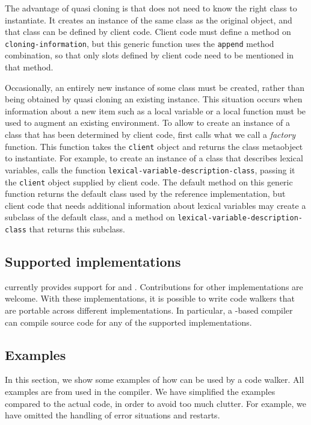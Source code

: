 The advantage of quasi cloning is that \trucler{} does not need to know
the right class to instantiate.  It creates an instance of the same
class as the original object, and that class can be defined by client
code.  Client code must define a method on
\texttt{cloning-information}, but this generic function uses the
\texttt{append} method combination, so that only slots defined by
client code need to be mentioned in that method.

Occasionally, an entirely new instance of some class must be created,
rather than being obtained by quasi cloning an existing instance.
This situation occurs when information about a new item such as a
local variable or a local function must be used to augment an existing
environment.  To allow \trucler{} to create an instance of a class
that has been determined by client code, \trucler{} first calls what
we call a \emph{factory} function.  This function takes the
\texttt{client} object and returns the class metaobject to
instantiate.  For example, to create an instance of a class that
describes lexical variables, \trucler{} calls the function
\texttt{lexical-variable-description-class}, passing it the
\texttt{client} object supplied by client code.  The default method on
this generic function returns the default class used by the reference
implementation, but client code that needs additional information
about lexical variables may create a subclass of the default class,
and a method on \texttt{lexical-variable-description-class} that
returns this subclass.

\subsection{Supported \commonlisp{} implementations}
\label{trucler-supported-implementations}

\trucler{} currently provides support for \sbcl{} and \ccl{}.
Contributions for other \commonlisp{} implementations are welcome.
With these implementations, it is possible to write code walkers that
are portable across different \commonlisp{} implementations.  In
particular, a \cleavir{}-based compiler can compile source code for
any of the supported implementations.

\subsection{Examples}

In this section, we show some examples of how \trucler{} can be used
by a code walker.  All examples are from \cleavir{} used in the
\sicl{} compiler.  We have simplified the examples compared to the
actual code, in order to avoid too much clutter.  For example, we have
omitted the handling of error situations and restarts.

